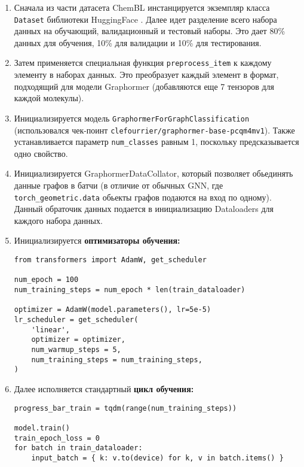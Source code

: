\newcommand\wtt[1]{%
  \hfil\penalty0\hfilneg\texttt{#1}%
}

\begin{enumerate}
\item Сначала из части датасета ChemBL \cite{ChemBL} инстанцируется экземпляр класса \texttt{Dataset} библиотеки HuggingFace \cite{huggingface}. Далее идет разделение всего набора данных на обучающий, валидационный и тестовый наборы. Это дает 80\% данных для обучения, 10\% для валидации и 10\% для тестирования.

\item Затем применяется специальная функция \texttt{preprocess\_item} к каждому элементу в наборах данных. Это преобразует каждый элемент в формат, подходящий для модели Graphormer (добавляются еще 7 тензоров для каждой молекулы).

\item Инициализируется модель \texttt{GraphormerForGraphClassification} (использовался чек-поинт \texttt{clefourrier/graphormer-base-pcqm4mv1}). Также устанавливается параметр \texttt{num\_classes} равным 1, поскольку предсказывается одно свойство.

\item Инициализируется GraphormerDataCollator, который позволяет обьединять данные графов в батчи (в отличие от обычных GNN, где \texttt{torch\_geometric.data} обьекты графов подаются на вход по одному). Данный обраточик данных подается в инициализацию Dataloaders для каждого набора данных.

\item Инициализируется \textbf{оптимизаторы обучения:}
\begin{lstlisting}
from transformers import AdamW, get_scheduler

num_epoch = 100
num_training_steps = num_epoch * len(train_dataloader)

optimizer = AdamW(model.parameters(), lr=5e-5)
lr_scheduler = get_scheduler(
    'linear',
    optimizer = optimizer,
    num_warmup_steps = 5,
    num_training_steps = num_training_steps,
)
\end{lstlisting}


\item Далее исполняется стандартный \textbf{цикл обучения:}
\begin{lstlisting}
progress_bar_train = tqdm(range(num_training_steps))

model.train()
train_epoch_loss = 0
for batch in train_dataloader:
    input_batch = { k: v.to(device) for k, v in batch.items() }
    

\end{lstlisting}
\end{enumerate}
